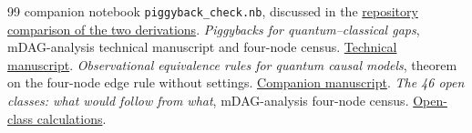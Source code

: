 \begin{thebibliography}{99}
companion notebook \texttt{piggyback\_check.nb}, discussed in the
\href{https://github.com/eliewolfe/mDAG-analysis/blob/1159e18/manuscript/kpc_figure4_vs_code.md}{repository comparison of the two derivations}.
 \emph{Piggybacks for quantum--classical gaps},
mDAG-analysis technical manuscript and four-node census.
\href{https://github.com/eliewolfe/mDAG-analysis/blob/main/manuscript/piggybacks.md}{Technical manuscript}.
 \emph{Observational equivalence rules for quantum
causal models}, theorem on the four-node edge rule without settings.
\href{https://github.com/eliewolfe/mDAG-analysis/blob/main/manuscript/observational\%20classification/observational_classification.pdf}{Companion manuscript}.
 \emph{The 46 open classes: what would follow from what},
mDAG-analysis four-node census.
\href{https://github.com/eliewolfe/mDAG-analysis/blob/1159e18/manuscript/open_classes.md}{Open-class calculations}.
\end{thebibliography}
